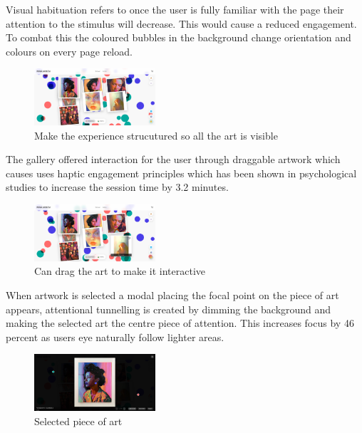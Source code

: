 \documentclass[]{project_final}
\begin{document}
Visual habituation refers to once the user is fully familiar with the page their attention to the stimulus will decrease. This would cause a reduced engagement. To combat this the coloured bubbles in the background change orientation and colours on every page reload.

\begin{figure}[ht!]
  \centering
  \includegraphics[width=0.4\textwidth]{AG29.png}
  \vspace*{0.0cm}
  \caption{Make the experience strucutured so all the art is visible}
  \label{fig:1}
\end{figure}

The gallery offered interaction for the user through draggable artwork which causes uses haptic engagement principles which has been shown in psychological studies to increase the session time by 3.2 minutes.

\begin{figure}[ht!]
  \centering
  \includegraphics[width=0.4\textwidth]{AG30.png}
  \vspace*{0.0cm}
  \caption{Can drag the art to make it interactive}
  \label{fig:1}
\end{figure}

When artwork is selected a modal placing the focal point on the piece of art appears, attentional tunnelling is created by dimming the background and making the selected art the centre piece of attention. This increases focus by 46 percent as users eye naturally follow lighter areas.

\begin{figure}[ht!]
  \centering
  \includegraphics[width=0.4\textwidth]{AG31.png}
  \vspace*{0.0cm}
  \caption{Selected piece of art}
  \label{fig:1}
\end{figure}
\end{document}
